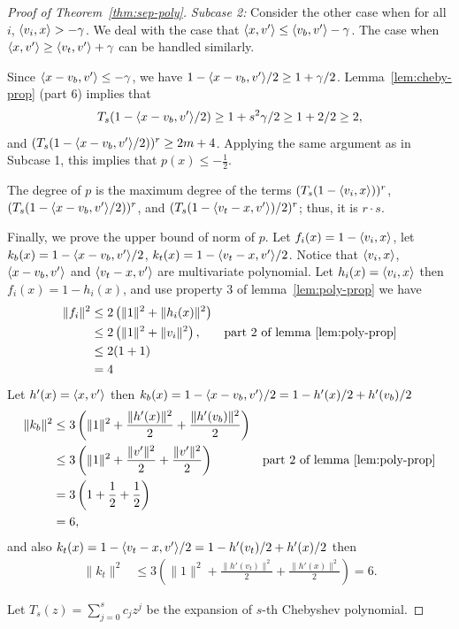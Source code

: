 \begin{proof}[Proof of Theorem~\ref{thm:sep-poly}]
{\em Subcase 2:} Consider the other case when for all $i$, $\langle v_i,x\rangle > -\gamma$.
We deal with the case that $\langle x,v'\rangle \leq \langle v_b,v'\rangle-\gamma$.  
The case when $\langle x,v'\rangle \geq \langle v_t,v'\rangle+\gamma$ can be handled similarly.

Since $\langle x-v_b,v'\rangle \leq -\gamma$, we have $1-\langle x-v_b,v'\rangle/2\geq 1 + \gamma/2$.
Lemma~\ref{lem:cheby-prop} (part 6) implies that
\[
  T_s(1-\langle x-v_b,v'\rangle/2)\geq 1+s^2\gamma/2 \geq 1+2/2 \geq 2,
\]
and $(T_s(1-\langle x-v_b,v'\rangle/2))^r\geq 2m+4$.  
Applying the same argument as in Subcase 1, this implies that $p(x)\leq-\frac{1}{2}$.

The degree of $p$ is the maximum degree of the terms $(T_s(1-\langle v_i,x\rangle))^r$, $(T_s(1-\langle x-v_b,v'\rangle/2))^r$, and $(T_s(1-\langle v_t-x,v'\rangle)/2)^r$; thus, it is $r\cdot s$.

Finally, we prove the upper bound of norm of $p$. 
Let $f_i(x)=1-\langle v_i,x\rangle$, 
let $k_b(x)=1-\langle x-v_b,v'\rangle/2$, $k_t(x)=1-\langle v_t-x,v'\rangle/2$.
Notice that $\langle v_i,x\rangle$,$\langle x-v_b,v'\rangle$ and $\langle v_t-x,v'\rangle$ are multivariate polynomial.
Let $h_i(x)=\langle v_i,x\rangle$ then $f_i(x)=1-h_i(x)$, and use property 3 of lemma~\ref{lem:poly-prop} we have
\begin{align*}
\|f_i\|^2&\leq 2\left(\|1\|^2 +\|h_i(x)\|^2 \right) \\
&\leq 2\left(\|1\|^2 +\|v_i\|^2 \right), & \text{part 2 of lemma~\ref{lem:poly-prop}} \\
&\leq 2(1+1) \\
&=4 
\end{align*}
Let $h'(x)=\langle x,v'\rangle$ then $k_b(x)=1-\langle x-v_b,v'\rangle/2=1-h'(x)/2+h'(v_b)/2$
\begin{align*}
\|k_b\|^2&\leq 3\left( \|1\|^2 + \frac{\|h'(x)\|^2}{2}+ \frac{\|h'(v_b)\|^2}{2} \right) \\
&\leq 3\left( \|1\|^2 + \frac{\|v'\|^2}{2}+ \frac{\|v'\|^2}{2} \right) & \text{part 2 of lemma~\ref{lem:poly-prop}} \\
&= 3\left(1+\frac{1}{2}+\frac{1}{2}\right) \\
&=6,
\end{align*}
and also $k_t(x)=1-\langle v_t-x,v'\rangle/2=1-h'(v_t)/2+h'(x)/2$ then
\begin{align*}
  \|k_t\|^2&\leq 3\left( \|1\|^2 + \frac{\|h'(v_t)\|^2}{2}+ \frac{\|h'(x)\|^2}{2} \right)=6.
\end{align*}

Let $T_s(z)=\sum_{j=0}^s c_j z^j$ be the expansion of $s$-th Chebyshev polynomial.


\end{proof}
